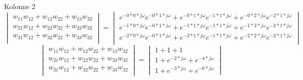 \begin{Opgaver}
\begin{kapitel}
\begin{Opgave}
\begin{UnderOpgave}
                Kolonne 2
                \[\begin{vmatrix}
                    w_{11}w_{12} + w_{12}w_{22} +w_{13}w_{32} \\
                    w_{21}w_{12} + w_{22}w_{22} +w_{23}w_{32} \\
                    w_{31}w_{12} + w_{32}w_{22} +w_{33}w_{32} \\
                \end{vmatrix}
                = 
                \begin{vmatrix}
                    e^{-0*0 * j\omega}e^{-0*1 * j\omega} + e^{-0*1 * j\omega}e^{-1*1 * j\omega} + e^{-0*2 * j\omega}e^{-2*1 * j\omega}  \\
                    e^{-1*0 * j\omega}e^{-0*1 * j\omega} + e^{-1*1 * j\omega}e^{-1*1 * j\omega} + e^{-1*2 * j\omega}e^{-2*1 * j\omega}  \\
                    e^{-2*0 * j\omega}e^{-0*1 * j\omega} + e^{-2*1 * j\omega}e^{-1*1 * j\omega} + e^{-2*2 * j\omega}e^{-2*1 * j\omega}  \\
                \end{vmatrix}\]
                \[\begin{vmatrix}
                    w_{11}w_{12} + w_{12}w_{22} +w_{13}w_{32} \\
                    w_{21}w_{12} + w_{22}w_{22} +w_{23}w_{32} \\
                    w_{31}w_{12} + w_{32}w_{22} +w_{33}w_{32} \\
                \end{vmatrix}
                = 
                \begin{vmatrix}
                    1 + 1 + 1                                 \\
                    1 + e^{-2 * j\omega} + e^{-4 * j\omega}   \\
                    1 + e^{-3 * j\omega} + e^{-6 * j\omega}   
                \end{vmatrix}\]\\\\



\end{UnderOpgave}
\end{Opgave}
\end{kapitel}
\end{Opgaver}
